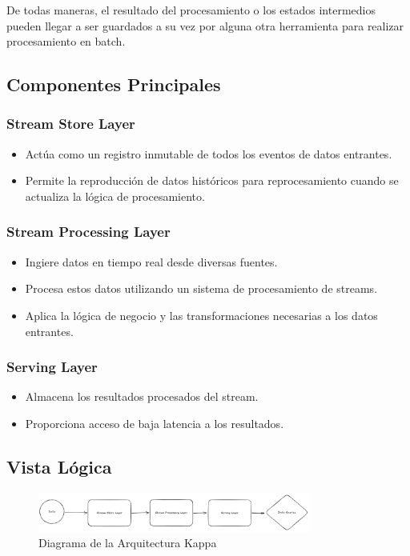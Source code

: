 De todas maneras, el resultado del procesamiento o los estados intermedios pueden llegar a ser guardados a su vez por alguna otra herramienta
para realizar procesamiento en batch. 

\newpage
\subsection{Componentes Principales}

\subsubsection{Stream Store Layer}
\begin{itemize}
    \item Actúa como un registro inmutable de todos los eventos de datos entrantes.
    \item Permite la reproducción de datos históricos para reprocesamiento cuando se actualiza la lógica de procesamiento.
\end{itemize}

\subsubsection{Stream Processing Layer}
\begin{itemize}
    \item Ingiere datos en tiempo real desde diversas fuentes.
    \item Procesa estos datos utilizando un sistema de procesamiento de streams.
    \item Aplica la lógica de negocio y las transformaciones necesarias a los datos entrantes.
\end{itemize}

\subsubsection{Serving Layer}
\begin{itemize}
    \item Almacena los resultados procesados del stream.
    \item Proporciona acceso de baja latencia a los resultados.
\end{itemize}

\newpage
\subsection{Vista Lógica}
\begin{figure}[h]
\centering
\includegraphics[width=0.8\textwidth]{teorico/arquitecturas/kappa.png}
\caption{Diagrama de la Arquitectura Kappa}
\label{fig:arquitectura_kappa}
\end{figure}

